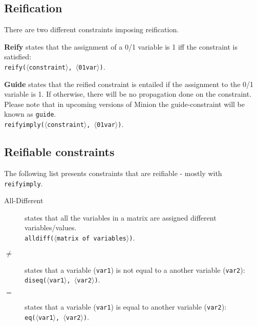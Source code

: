 \documentclass{article}
\begin{document}
\begin{small}
\subsection{Reification}

There are two different constraints imposing reification.

\begin{description}
\item \textbf{Reify} states that the assignment of a 0/1 variable
is 1 iff the constraint is satisfied:\\
\texttt{reify($\langle$constraint$\rangle$, $\langle$01var$\rangle$)}.

\item \textbf{Guide} states that  the reified constraint is entailed if the 
assignment to the 0/1 variable is 1. If otherwise, there will be no propagation done 
on the constraint. Please note that in upcoming versions of Minion the guide-constraint will be known as 
\texttt{guide}. %
\\
\texttt{reifyimply($\langle$constraint$\rangle$, $\langle$01var$\rangle$)}.

\end{description}


\subsection{Reifiable constraints}

The following list presents constraints that are reifiable - mostly with
 \texttt{reifyimply}.  

\begin{description}
\item[All-Different] states that all the variables in a matrix are
assigned different variables/values.\\ 
\texttt{alldiff($\langle$matrix of
variables$\rangle$)}.

\item[$ \mathbf{\neq}$] states that a variable (\texttt{var1}) is not
equal to a another variable (\texttt{var2}):\\
\texttt{diseq($\langle$var1$\rangle$, $\langle$var2$\rangle$)}.

\item[$\mathbf{=}$] states that a variable (\texttt{var1}) is equal to
another variable (\texttt{var2}):\\
\texttt{eq($\langle$var1$\rangle$, $\langle$var2$\rangle$)}.


\end{description}
\end{small}
\end{document}
